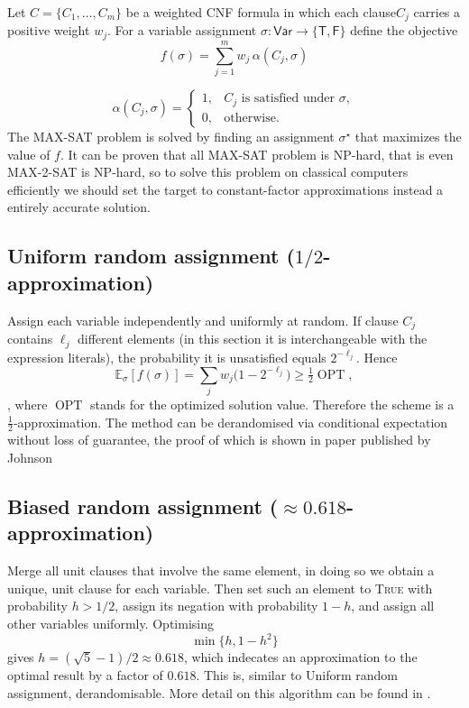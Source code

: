\documentclass[%
 reprint,
 amsmath,amssymb,
 aps,
]{revtex4-2}
\begin{document}
Let \(C=\{C_1,\dots,C_m\}\) be a weighted CNF formula in which each clause\(C_j\) carries a positive weight \(w_j\). For a variable assignment \(\sigma\colon \mathsf{Var}\to\{\mathsf{T},\mathsf{F}\}\) define the objective
\begin{equation}
  f(\sigma) = \sum_{j=1}^{m}w_j\,\alpha(C_j,\sigma)
\end{equation}

\begin{equation}
  \alpha(C_j,\sigma) = 
  \begin{cases}
    1,& C_j\text{ is satisfied under }\sigma,\\
    0,&\text{otherwise}.
  \end{cases}
\end{equation}
The MAX-SAT problem is solved by finding an assignment \(\sigma^\star\) that maximizes the value of \(f\). It can be proven that all MAX-SAT problem is NP-hard, that is even MAX-2-SAT is NP-hard, so to solve this problem on classical computers efficiently we should set the target to constant-factor approximations instead a entirely accurate solution.

\subsection{Uniform random assignment (\(1/2\)-approximation)}
\label{subsec:random}

Assign each variable independently and uniformly at random. If clause \(C_j\) contains \(\ell_j\) different elements (in this section it is interchangeable with the expression literals), the probability it is unsatisfied equals \(2^{-\ell_j}\).  Hence
$$
  \mathbb{E}_{\sigma}[f(\sigma)]
  =\sum_{j} w_j\bigl(1-2^{-\ell_j}\bigr)
  \ge \tfrac12\operatorname{OPT},
$$
, where \(\operatorname{OPT}\) stands for the optimized solution value. Therefore the scheme is a \(\tfrac12\)-approximation. The method can be derandomised via conditional expectation without loss of guarantee, the proof of which is shown in paper published by Johnson \cite{johnson1974approximation}

\subsection{Biased random assignment (\(\approx0.618\)-approximation)}
\label{subsec:hunch}

Merge all unit clauses that involve the same element, in doing so we obtain a unique, unit clause for each variable.  Then set such an element to \textsc{True} with probability \(h>1/2\), assign its negation with probability \(1-h\), and assign all other variables uniformly. Optimising 
$$\min\{h,1-h^{2}\}$$
gives \(h=(\sqrt5-1)/2\approx0.618\), which indecates an approximation to the optimal result by a factor of \(0.618\). This is, similar to Uniform random assignment, derandomisable. More detail on this algorithm can be found in \cite{AlonSpencer2008}.
\end{document}
